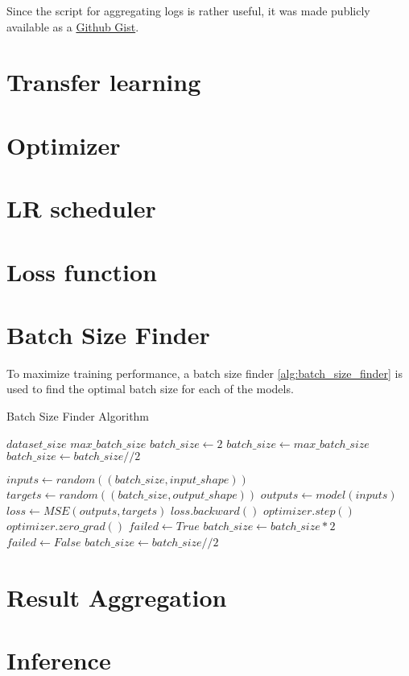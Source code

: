 Since the script for aggregating logs is rather useful, it was made publicly available as a \href{https://gist.github.com/SubhadityaMukherjee/58cbdf324812175233e91993b720e0bc}{Github Gist}.

\section{Transfer learning}
\section{Optimizer}
\section{LR scheduler}
\section{Loss function}
\section{Batch Size Finder}
To maximize training performance, a batch size finder \ref{alg:batch_size_finder} is used to find the optimal batch size for each of the models.

\begin{algorithm}
    \caption{Batch Size Finder Algorithm}
    \label{alg:batch_size_finder}
    \begin{algorithmic}
        \REQUIRE $dataset\_size$
        \REQUIRE $max\_batch\_size$
        \STATE $batch\_size \leftarrow 2$
        \STATE $batch\_size \leftarrow max\_batch\_size$
        \ENDIF
        \STATE $batch\_size \leftarrow batch\_size // 2$
        \ENDIF

        \LOOP
        \STATE $inputs \leftarrow random((batch\_size,input\_shape))$
        \STATE $targets \leftarrow random((batch\_size,output\_shape))$
        \STATE $outputs \leftarrow model(inputs)$
        \STATE $loss \leftarrow MSE(outputs, targets)$
        \STATE $loss.backward()$
        \STATE $optimizer.step()$
        \STATE $optimizer.zero\_grad()$
        \STATE $failed \leftarrow True$
        \STATE $batch\_size \leftarrow batch\_size * 2$
        \ENDLOOP
        \STATE $failed \leftarrow False$
        \STATE $batch\_size \leftarrow batch\_size // 2$
        \ENDIF

        \ENDWHILE

    \end{algorithmic}
\end{algorithm}

\section{Result Aggregation} \label{sec:result_aggregation}

\section{Inference}